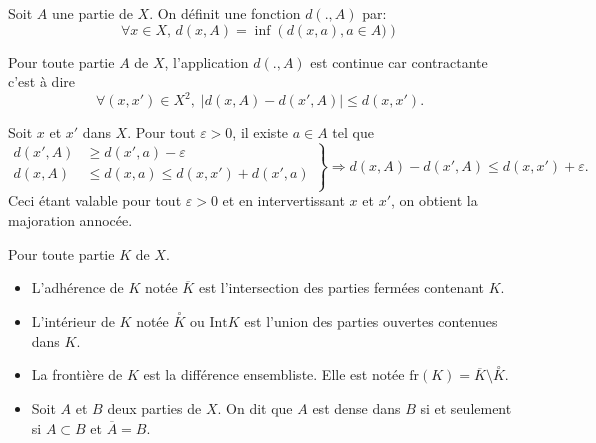 \begin{defi}
 Soit $A$ une partie de $X$. On définit une fonction $d(.,A)$ par:
 \begin{displaymath}
  \forall x\in X, \, d(x,A) = \inf\left(d(x,a), a\in A)\right)
 \end{displaymath}
\end{defi}

\begin{propn}\label{prop:ContDistPart}
 Pour toute partie $A$ de $X$, l'application $d(.,A)$ est continue car contractante c'est à dire
 \begin{displaymath}
  \forall (x,x') \in X^2, \; \left|d(x,A) - d(x',A)\right| \leq d(x,x').
 \end{displaymath}
\end{propn}
\begin{demo}
Soit $x$ et $x'$ dans $X$. Pour tout $\varepsilon > 0$, il existe $a \in A$ tel que
\begin{displaymath}
\left.
  \begin{aligned}
    d(x',A) &\geq d(x',a) - \varepsilon \\
    d(x,A) &\leq d(x,a) \leq d(x,x') + d(x',a)\\
  \end{aligned}
\right\rbrace
\Rightarrow
d(x,A) - d(x',A) \leq d(x,x') + \varepsilon.
\end{displaymath}
Ceci étant valable pour tout $\varepsilon >0$ et en intervertissant $x$ et $x'$, on obtient la majoration annocée.
\end{demo}

   
\begin{defi}
Pour toute partie $K$ de $X$.
\begin{itemize}
 \item L'adhérence de $K$ notée $\overline{K}$ est l'intersection des parties fermées contenant $K$.
 \item L'intérieur de $K$ notée $\overset{\circ}{K}$ ou $\mathrm{Int}K $ est l'union des parties ouvertes contenues dans $K$.
 \item La frontière de $K$ est la différence ensembliste. Elle est notée $\mathrm{fr}(K) = \overline{K} \setminus \overset{\circ}{K}$.
 \item Soit $A$ et $B$ deux parties de $X$. On dit que $A$ est dense dans $B$ si et seulement si $A\subset B$ et $\overline{A} = B$.
\end{itemize}
\end{defi}

